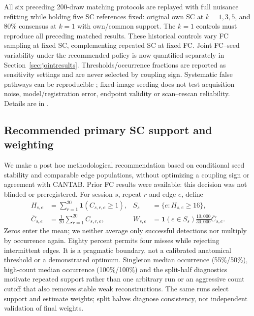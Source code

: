 \documentclass[11pt,a4paper]{article}
\begin{document}
All six preceding 200-draw matching protocols are replayed with full nuisance refitting while holding five SC references fixed: original own SC at $k=1,3,5$, and 80\% consensus at $k=1$ with own/common support. The $k=1$ controls must reproduce all preceding matched results. These historical controls vary FC sampling at fixed SC, complementing repeated SC at fixed FC. Joint FC--seed variability under the recommended policy is now quantified separately in Section~\ref{sec:jointresults}. Thresholds/occurrence fractions are reported as sensitivity settings and are never selected by coupling sign. Systematic false pathways can be reproducible \citep{maierhein2017}; fixed-image seeding does not test acquisition noise, model/registration error, endpoint validity or scan--rescan reliability. Details are in .

\subsection{Recommended primary SC support and weighting}\label{sec:primaryscmethods}
We make a post hoc methodological recommendation based on conditional seed stability and comparable edge populations, without optimizing a coupling sign or agreement with CANTAB. Prior FC results were available: this decision was not blinded or preregistered. For session $s$, repeat $r$ and edge $e$, define
\begin{equation}
\begin{aligned}
 H_{s,e}&=\sum_{r=1}^{20}\mathbf{1}(C_{s,r,e}\geq1),&
 S_s&=\{e:H_{s,e}\geq16\},\\
 \bar C_{s,e}&=\frac{1}{20}\sum_{r=1}^{20}C_{s,r,e},&
 W_{s,e}&=\mathbf{1}(e\in S_s)\frac{10{,}000}{30{,}000}\bar C_{s,e}.
\end{aligned}
\end{equation}
Zeros enter the mean; we neither average only successful detections nor multiply by occurrence again. Eighty percent permits four misses while rejecting intermittent edges. It is a pragmatic boundary, not a calibrated anatomical threshold or a demonstrated optimum. Singleton median occurrence (55\%/50\%), high-count median occurrence (100\%/100\%) and the split-half diagnostics motivate repeated support rather than one arbitrary run or an aggressive count cutoff that also removes stable weak reconstructions. The same runs select support and estimate weights; split halves diagnose consistency, not independent validation of final weights.
\end{document}
